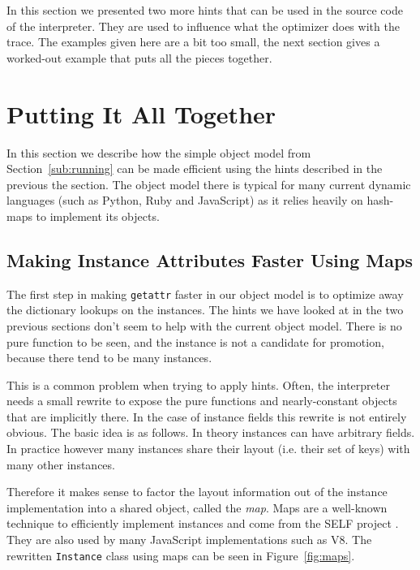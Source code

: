 \documentclass{sig-alternate}
\let\oldcite=\cite
\renewcommand\cite[1]{\ifthenelse{\equal{#1}{XXX}}{[citation~needed]}{\oldcite{#1}}}
\begin{document}
In this section we presented two more hints that can be used in the source code
of the interpreter. They are used to influence what the optimizer does with the
trace. The examples given here are a bit too small, the next
section gives a worked-out example that puts all the pieces together.


\section{Putting It All Together}

In this section we describe how the simple object model from
Section~\ref{sub:running} can be made efficient using the hints described in the
previous the section. The object model there is typical for many current
dynamic languages (such as Python, Ruby and JavaScript) as it relies heavily on
hash-maps to implement its objects.


\subsection{Making Instance Attributes Faster Using Maps}

The first step in making \texttt{getattr} faster in our object model is to optimize
away the dictionary lookups on the instances. The hints we have looked at in the
two previous sections don't seem to help with the current object model. There is
no pure function to be seen, and the instance is not a candidate for promotion,
because there tend to be many instances.

This is a common problem when trying to apply hints. Often, the interpreter
needs a small rewrite to expose the pure functions and nearly-constant objects
that are implicitly there. In the case of instance fields this rewrite is not
entirely obvious. The basic idea is as follows. In theory instances can have
arbitrary fields. In practice however many instances share their layout (i.e.
their set of keys) with many other instances.

Therefore it makes sense to factor the layout information out of the instance
implementation into a shared object, called the \emph{map}. Maps are a well-known
technique to efficiently implement instances and come from the SELF project
\cite{XXX}. They are also used by many JavaScript implementations such as V8.
The rewritten \texttt{Instance} class using maps can be seen in
Figure~\ref{fig:maps}.
\end{document}
